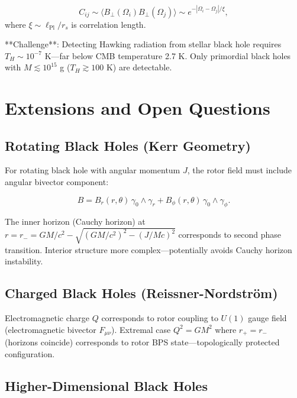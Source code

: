 \documentclass[11pt,a4paper]{article}
\numberwithin{equation}{section}
\theoremstyle{plain}
\theoremstyle{definition}
\theoremstyle{remark}
\begin{document}
\begin{equation}
C_{ij} \sim \langle B_\perp(\Omega_i) B_\perp(\Omega_j) \rangle \sim e^{-|\Omega_i - \Omega_j|/\xi},
\end{equation}
where $\xi \sim \ell_{\text{Pl}}/r_s$ is correlation length.

**Challenge**: Detecting Hawking radiation from stellar black hole requires $T_H \sim 10^{-7}$ K—far below CMB temperature 2.7 K. Only primordial black holes with $M \lesssim 10^{15}$ g ($T_H \gtrsim 100$ K) are detectable.

\section{Extensions and Open Questions}
\label{sec:extensions}

\subsection{Rotating Black Holes (Kerr Geometry)}

For rotating black hole with angular momentum $J$, the rotor field must include angular bivector component:

\begin{equation}
B = B_r(r,\theta)\, \gamma_0 \wedge \gamma_r + B_\phi(r,\theta)\, \gamma_0 \wedge \gamma_\phi.
\end{equation}

The inner horizon (Cauchy horizon) at $r = r_- = GM/c^2 - \sqrt{(GM/c^2)^2 - (J/Mc)^2}$ corresponds to second phase transition. Interior structure more complex—potentially avoids Cauchy horizon instability.

\subsection{Charged Black Holes (Reissner-Nordström)}

Electromagnetic charge $Q$ corresponds to rotor coupling to $U(1)$ gauge field (electromagnetic bivector $F_{\mu\nu}$). Extremal case $Q^2 = GM^2$ where $r_+ = r_-$ (horizons coincide) corresponds to rotor BPS state—topologically protected configuration.

\subsection{Higher-Dimensional Black Holes}
\end{document}
